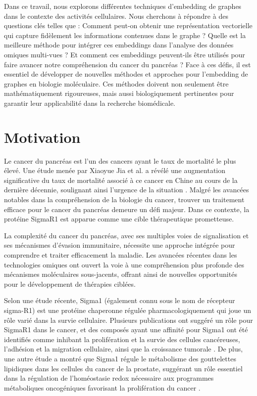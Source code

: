 Dans ce travail, nous explorons différentes techniques d'embedding de graphes dans le contexte des activités cellulaires. Nous cherchons à répondre à des questions clés telles que : Comment peut-on obtenir une représentation vectorielle qui capture fidèlement les informations contenues dans le graphe ? Quelle est la meilleure méthode pour intégrer ces embeddings dans l'analyse des données omiques multi-vues ? Et comment ces embeddings peuvent-ils être utilisés pour faire avancer notre compréhension du cancer du pancréas ? Face à ces défis, il est essentiel de développer de nouvelles méthodes et approches pour l'embedding de graphes en biologie moléculaire. Ces méthodes doivent non seulement être mathématiquement rigoureuses, mais aussi biologiquement pertinentes pour garantir leur applicabilité dans la recherche biomédicale.

\section{Motivation}

Le cancer du pancréas est l'un des cancers ayant le taux de mortalité le plus élevé. Une étude menée par Xiaoyue Jia et al. a révélé une augmentation significative du taux de mortalité associé à ce cancer en Chine au cours de la dernière décennie, soulignant ainsi l'urgence de la situation \cite{Jia2018}. Malgré les avancées notables dans la compréhension de la biologie du cancer, trouver un traitement efficace pour le cancer du pancréas demeure un défi majeur. Dans ce contexte, la protéine SigmaR1 est apparue comme une cible thérapeutique prometteuse.

La complexité du cancer du pancréas, avec ses multiples voies de signalisation et ses mécanismes d'évasion immunitaire, nécessite une approche intégrée pour comprendre et traiter efficacement la maladie. Les avancées récentes dans les technologies omiques ont ouvert la voie à une compréhension plus profonde des mécanismes moléculaires sous-jacents, offrant ainsi de nouvelles opportunités pour le développement de thérapies ciblées.

Selon une étude récente, Sigma1 (également connu sous le nom de récepteur sigma-R1) est une protéine chaperonne régulée pharmacologiquement qui joue un rôle varié dans la survie cellulaire. Plusieurs publications ont suggéré un rôle pour SigmaR1 dans le cancer, et des composés ayant une affinité pour Sigma1 ont été identifiés comme inhibant la prolifération et la survie des cellules cancéreuses, l'adhésion et la migration cellulaire, ainsi que la croissance tumorale \cite{Kim2017}. De plus, une autre étude a montré que Sigma1 régule le métabolisme des gouttelettes lipidiques dans les cellules du cancer de la prostate, suggérant un rôle essentiel dans la régulation de l'homéostasie redox nécessaire aux programmes métaboliques oncogéniques favorisant la prolifération du cancer \cite{Oyer2023}.

